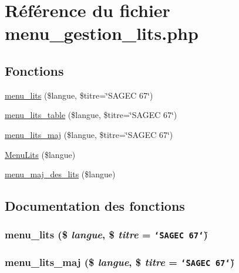 \hypertarget{menu__gestion__lits_8php}{
\section{R\'{e}f\'{e}rence du fichier menu\_\-gestion\_\-lits.php}
\label{menu__gestion__lits_8php}
}
\subsection*{Fonctions}
\begin{CompactItemize}
\item 
\hyperlink{menu__gestion__lits_8php_a0}{menu\_\-lits} (\$langue, \$titre=\char`\"{}SAGEC 67\char`\"{})
\item 
\hyperlink{menu__gestion__lits_8php_a1}{menu\_\-lits\_\-table} (\$langue, \$titre=\char`\"{}SAGEC 67\char`\"{})
\item 
\hyperlink{menu__gestion__lits_8php_a2}{menu\_\-lits\_\-maj} (\$langue, \$titre=\char`\"{}SAGEC 67\char`\"{})
\item 
\hyperlink{menu__gestion__lits_8php_a3}{Menu\-Lits} (\$langue)
\item 
\hyperlink{menu__gestion__lits_8php_a4}{menu\_\-maj\_\-des\_\-lits} (\$langue)
\end{CompactItemize}


\subsection{Documentation des fonctions}
\hypertarget{menu__gestion__lits_8php_a0}{
\subsubsection[menu\_\-lits]{\setlength{\rightskip}{0pt plus 5cm}menu\_\-lits (\$ {\em langue}, \$ {\em titre} = {\tt \char`\"{}SAGEC\ 67\char`\"{}})}}
\label{menu__gestion__lits_8php_a0}


\hypertarget{menu__gestion__lits_8php_a2}{
\subsubsection[menu\_\-lits\_\-maj]{\setlength{\rightskip}{0pt plus 5cm}menu\_\-lits\_\-maj (\$ {\em langue}, \$ {\em titre} = {\tt \char`\"{}SAGEC\ 67\char`\"{}})}}
\label{menu__gestion__lits_8php_a2}


